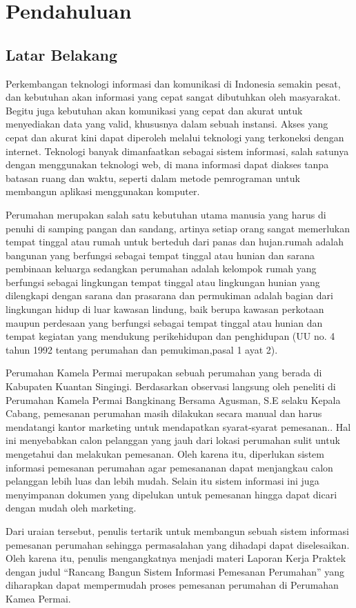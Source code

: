 \documentclass[12pt, a4paper, onecolumn, oneside, final]{report}
\begin{document}
\chapter{Pendahuluan}
\justifying
\section{Latar Belakang}
\par  Perkembangan teknologi informasi dan komunikasi di Indonesia semakin pesat, dan kebutuhan akan informasi yang cepat sangat dibutuhkan oleh masyarakat. Begitu juga kebutuhan akan komunikasi yang cepat dan akurat untuk menyediakan data yang valid, khususnya dalam sebuah instansi. Akses yang cepat dan akurat kini dapat diperoleh melalui teknologi yang terkoneksi dengan internet. Teknologi banyak dimanfaatkan sebagai sistem informasi, salah satunya dengan menggunakan teknologi web, di mana informasi dapat diakses tanpa batasan ruang dan waktu, seperti dalam metode pemrograman untuk membangun aplikasi menggunakan komputer.
\par Perumahan merupakan salah satu kebutuhan utama manusia yang harus di penuhi di samping pangan dan sandang, artinya setiap orang sangat memerlukan tempat tinggal atau rumah untuk berteduh dari panas dan hujan.rumah adalah bangunan yang berfungsi sebagai tempat tinggal atau hunian dan sarana pembinaan keluarga sedangkan perumahan adalah kelompok rumah yang berfungsi sebagai lingkungan tempat tinggal atau lingkungan hunian yang dilengkapi dengan sarana dan prasarana dan permukiman adalah bagian dari lingkungan hidup di luar kawasan lindung, baik berupa kawasan perkotaan maupun perdesaan yang berfungsi sebagai tempat tinggal atau hunian dan tempat kegiatan yang mendukung perikehidupan dan penghidupan (UU no. 4 tahun 1992 tentang perumahan dan pemukiman,pasal 1 ayat 2).
\par Perumahan Kamela Permai merupakan sebuah perumahan yang berada di Kabupaten Kuantan Singingi. Berdasarkan observasi langsung oleh peneliti di Perumahan Kamela Permai Bangkinang Bersama Agusman, S.E selaku Kepala Cabang, pemesanan perumahan masih dilakukan secara manual dan harus mendatangi kantor marketing untuk mendapatkan syarat-syarat pemesanan.. Hal ini menyebabkan calon pelanggan yang jauh dari lokasi perumahan sulit untuk mengetahui dan melakukan pemesanan. Oleh karena itu, diperlukan sistem informasi pemesanan perumahan agar pemesananan dapat menjangkau calon pelanggan lebih luas dan lebih mudah. Selain itu sistem informasi ini juga menyimpanan dokumen yang dipelukan untuk pemesanan hingga dapat dicari dengan mudah oleh marketing.
\par Dari uraian tersebut, penulis tertarik untuk membangun sebuah sistem informasi pemesanan perumahan sehingga permasalahan yang dihadapi dapat diselesaikan. Oleh karena itu, penulis mengangkatnya menjadi materi Laporan Kerja Praktek dengan judul “Rancang Bangun Sistem Informasi Pemesanan Perumahan” yang diharapkan dapat mempermudah proses pemesanan perumahan di Perumahan Kamea Permai.
\end{document}
